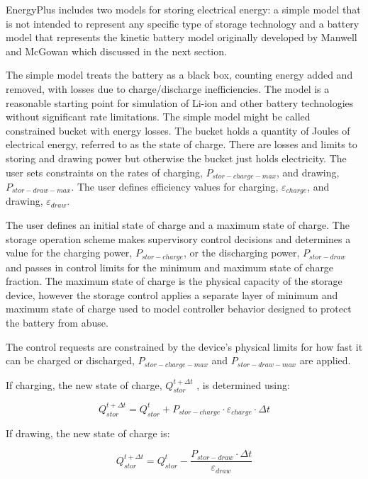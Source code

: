 EnergyPlus includes two models for storing electrical energy: a simple model that is not intended to represent any specific type of storage technology and a battery model that represents the kinetic battery model originally developed by Manwell and McGowan which discussed in the next section.

The simple model treats the battery as a black box, counting energy added and removed, with losses due to charge/discharge inefficiencies. The model is a reasonable starting point for simulation of Li-ion and other battery technologies without significant rate limitations. The simple model might be called constrained bucket with energy losses.  The bucket holds a quantity of Joules of electrical energy, referred to as the state of charge. There are losses and limits to storing and drawing power but otherwise the bucket just holds electricity. The user sets constraints on the rates of charging, ${P_{stor-charge-max}}$, and drawing, ${P_{stor-draw-max}}$. The user defines efficiency values for charging, ${\varepsilon_{charge}}$, and drawing, ${\varepsilon_{draw}}$. 

The user defines an initial state of charge and a maximum state of charge. The storage operation scheme makes supervisory control decisions and determines a value for the charging power, ${P_{stor-charge}}$, or the discharging power, ${P_{stor-draw}}$ and passes in control limits for the minimum and maximum state of charge fraction.  The maximum state of charge is the physical capacity of the storage device, however the storage control applies a separate layer of minimum and maximum state of charge used to model controller behavior designed to protect the battery from abuse. 

The control requests are constrained by the device's physical limits for how fast it can be charged or discharged, ${P_{stor-charge-max}}$ and ${P_{stor-draw-max}}$ are applied.

If charging, the new state of charge, \(Q_{stor}^{t + \Delta t}\) , is determined using:

\begin{equation}
Q_{stor}^{t + \Delta t} = Q_{stor}^t + {P_{stor-charge}} \cdot {\varepsilon_{charge}} \cdot \Delta t
\end{equation}

If drawing, the new state of charge is:

\begin{equation}
Q_{stor}^{t + \Delta t} = Q_{stor}^t - \frac{{{P_{stor - draw}} \cdot \Delta t}}{{{\varepsilon_{draw}}}}
\end{equation}

